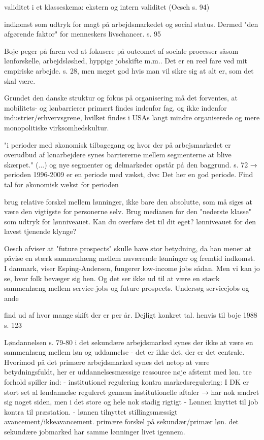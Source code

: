 validitet i et klasseskema: ekstern og intern validitet (Oesch s. 94)

indkomst som udtryk for magt på arbejdsmarkedet og social status. Dermed "den afgørende faktor" for menneskers livschancer. s. 95

Boje peger på faren ved at fokusere på outcomet af sociale processer såsom lønforskelle, arbejdsløshed, hyppige jobskifte m.m.. Det er en reel fare ved mit empiriske arbejde. s. 28, men meget god hvis man vil sikre sig at alt er, som det skal være. 

Grundet den danske struktur og fokus på organisering må det forventes, at mobilitets- og lønbarrierer primært findes indenfor fag, og ikke indenfor industrier/erhvervsgrene, hvilket findes i USAs langt mindre organiserede og mere monopolitiske virksomhedskultur. 

"i perioder med økonomisk tilbagegang og hvor der på arbejsmarkedet er overudbud af lønarbejdere synes barriererne mellem segmenterne at blive skærpet." (...) og nye segmenter og delmarkeder opstår på den baggrund. s. 72
→ perioden 1996-2009 er en periode med vækst, dvs: Det her en god periode. Find tal for økonomisk vækst for perioden


brug relative forskel mellem lønninger, ikke bare den absolutte, som må siges at være den vigtigste for personerne selv. Brug medianen for den "nederste klasse" som udtryk for lønniveauet. Kan du overføre det til dit eget? lønniveauet for den lavest tjenende klynge?

Oesch afviser at "future prospects" skulle have stor betydning, da han mener at påvise en stærk sammenhæng mellem nuværende lønninger og fremtid indkomst. I danmark, viser Esping-Andersen, fungerer low-income jobs sådan. Men vi kan jo se, hvor folk bevæger sig hen. Og det ser ikke ud til at være en stærk sammenhæng mellem service-jobs og future prospects. Undersøg servicejobs og ande


find ud af hvor mange skift der er per år. Dejligt konkret tal. henvis til boje 1988 s. 123


Løndannelsen s. 79-80
	i det sekundære arbejdsmarked synes der ikke at være en sammenhæng mellem løn og uddannelse - det er ikke det, der er det centrale. Hvorimod på det primære arbejdsmarked synes det netop at være betydningsfuldt, her er uddannelsesmæssige ressource nøje afstemt med løn. 
	tre forhold spiller ind:
	- institutionel regulering kontra markedsregulering: I DK er stort set al løndannelse reguleret gennem institutionelle aftaler 
	→ har nok ændret sig noget siden, men i det store og hele nok stadig rigtigt
	- Lønnen knyttet til job kontra til præstation.
	- lønnen tilnyttet stillingsmæssigt avancement/ikkeavancement. primære forskel på sekundær/primær løn. det sekundære jobmarked har samme lønninger livet igennem. 






















